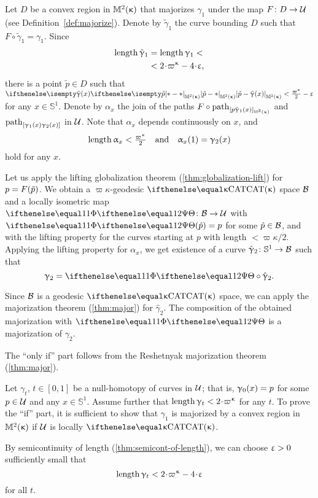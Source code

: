  Let $D$ be a convex region in $\mathbb{M}_{{}}^{2}({\upkappa})$ that majorizes $\gamma_1$ under the map $F\:D\to\spc{U}$ 
(see Definition~\ref{def:majorize}).
Denote by $\tilde \gamma_1$ 
the curve bounding $D$ 
such that $F\circ\tilde \gamma_1=\gamma_1$.
Since  
\begin{align*}
\length\tilde \gamma_1
&=
\length\gamma_1
<
\\
&<
2\cdot\varpi\kappa-4\cdot\eps,
\end{align*}
there is a point $\tilde p\in D$ such that 
$\dist{\tilde p}{\tilde \gamma(x)}{\Lob2\kappa}<\tfrac{\varpi\kappa}2-\eps$
for any $x\in\mathbb{S}^1$.
Denote by $\alpha_x$ the join of the paths $F\circ\geodpath_{[p\tilde \gamma_1(x)]_{\Lob2\kappa}}$ 
and  $\mathrm{path}_{[\upgamma_1(x)\upgamma_2(x)]}$ in $\mathcal{U}$.
Note that $\alpha_x$ depends continuously on $x$, and
$$\length\alpha_x<\tfrac{\varpi\kappa}{2}\quad \text{and}\quad \alpha_x(1)=\gamma_2(x)$$ 
hold for any $x$.

Let us apply the lifting globalization theorem
(\ref{thm:globalization-lift}) for $p\z=F(\tilde p)$.
We obtain a $\varpi\kappa$-geodesic $\CAT\kappa$ space $\mathcal{B}$
and a locally isometric map $\map\:\spc{B}\to\spc{U}$
with $\map(\hat p)=p$ for some $\hat p \in \spc{B}$, and with the lifting property for the curves starting at $p$ with length $<\varpi\kappa/2$.
Applying the lifting property for $\alpha_x$, 
we get existence of a curve $\hat\gamma_2\:\mathbb{S}^1\to \spc{B}$ such that
$$\gamma_2=\map\circ\hat\gamma_2.$$

Since $\mathcal{B}$ is a geodesic $\CAT\kappa$ space, we can apply the majorization theorem (\ref{thm:major}) for $\hat\gamma_2$.
The composition of the obtained majorization with $\map$ is a majorization of $\gamma_2$.
\qeds

The ``only if'' part follows from the Reshetnyak majorization theorem (\ref{thm:major}).

Let  $\gamma_t$, $t\in[0,1]$ 
be a null-homotopy of curves in $\mathcal{U}$;
that is, $\gamma_0(x)\z=p$ for some $p\in \spc{U}$
and any $x\in\mathbb{S}^1$.
Assume further that $\length \gamma_t\z<2\cdot\varpi\kappa$ for any $t$.
To prove the ``if'' part, it is sufficient to show that $\gamma_1$ is majorized by a convex region in $\mathbb{M}_{{}}^{2}({\upkappa})$ if $\mathcal{U}$ is locally $\CAT\kappa$. 

By semicontinuity of length (\ref{thm:semicont-of-length}),
we can choose  $\upvarepsilon>0$ sufficiently small that
$$\length \gamma_t<2\cdot\varpi\kappa-4\cdot\eps$$
for all $t$.


